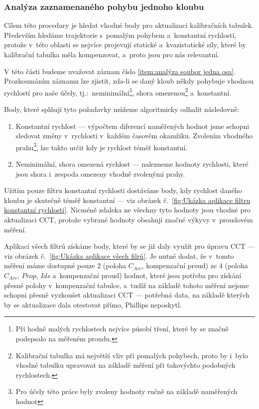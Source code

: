 \subsubsection{Analýza zaznamenaného pohybu jednoho kloubu}\label{section:Analýza záznamu jednoho kloubu}
Cílem této procedury je hledat vhodné body pro aktualizaci kalibračních tabulek. Především hledáme trajektorie s~pomalým pohybem a~konstantní rychlostí, protože v~této oblasti se nejvíce projevují statické a~kvazistatické síly, které by kalibrační tabulka měla kompenzovat, a~proto jsou pro nás relevantní.\par
V této části budeme uvažovat záznam číslo \ref{item:analýza soubor jedna osa}.
Prozkoumáním záznamu lze zjistit, zda-li se daný kloub někdy pohybuje vhodnou rychlostí pro naše účely, tj.:~neminimální\footnote{Při hodně malých rychlostech nejvíce působí tření, které by se značně podepsalo na měřeném proudu.}, shora omezenou\footnote{Kalibrační tabulka má největší vliv při pomalých pohybech, proto by i~bylo vhodné tabulku upravovat na základě měření při takovýchto podobných rychlostech.} a~konstantní.\par
Body, které splňují tyto požadavky můžeme algoritmicky odhalit následovně:
\begin{enumerate}
    \item Konstantní rychlost --- výpočtem diferencí naměřených hodnot jsme schopni sledovat změny v~rychlosti v~každém časovém okamžiku. Zvolením vhodného prahu\footnote{\label{footnote:volba prahu}Pro účely této práce byly zvoleny hodnoty ručně na základě naměřených hodnot}, lze takto určit kdy je rychlost téměř konstantní.
    \item Neminimální, shora omezená rychlost --- nalezneme hodnoty rychlosti, které jsou shora i~zespoda omezeny vhodně zvolenými prahy.
\end{enumerate}
Užitím pouze filtru konstantní rychlosti dostáváme body, kdy rychlost daného kloubu je skutečně téměř konstantní --- viz obrázek č.~\ref{fig:Ukázka aplikace filtru konstantní rychlosti}. Nicméně zdaleka ne všechny tyto hodnoty jsou vhodné pro aktualizaci CCT, protože vybrané hodnoty obsahují značné výkyvy v~proudovém měření.
\par
Aplikací všech filtrů získáme body, které by se již daly využít pro úpravu CCT --- viz obrázek č.~\ref{fig:Ukázka aplikace všech filrů}. Je nutné dodat, že v~tomto měření máme dostupné pouze 2 (poloha $C_{Arc}$, kompenzační proud) ze 4 (poloha $C_{Arc}$, $Prop$, $Ids$ a~kompenzační proud) hodnot, které jsou potřeba pro získání přesné polohy v~kompenzační tabulce, a~tudíž na základě tohoto měření nejsme schopni přesně vyzkoušet aktualizaci CCT --- potřebná data, na základě kterých by se aktualizace dala otestovat přímo, Phillips neposkytl.
